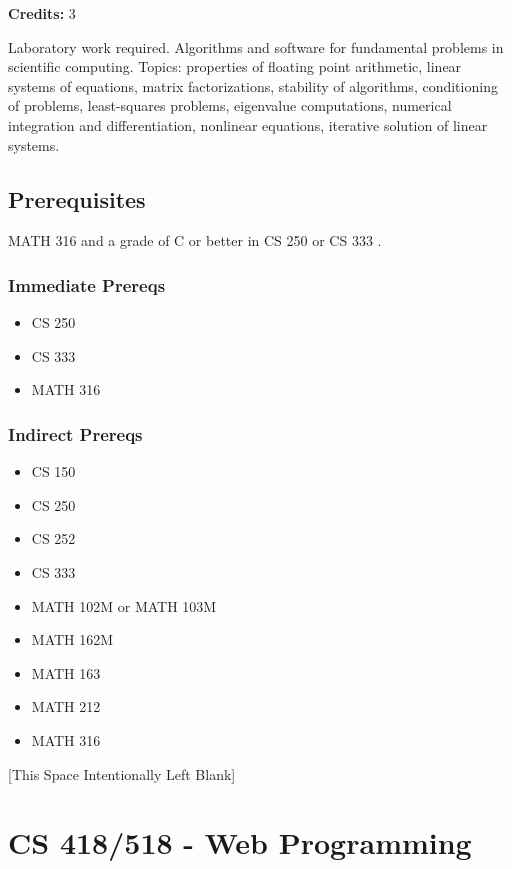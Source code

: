 \documentclass[]{article}
\providecommand{\tightlist}{%
  \setlength{\itemsep}{0pt}\setlength{\parskip}{0pt}}
\newcommand{\pagebreakhere}{
\vspace*{\fill}
\begin{center}
[This Space Intentionally Left Blank]
\end{center}
\vspace*{\fill}
\newpage
}
\begin{document}
\textbf{Credits:} 3

Laboratory work required. Algorithms and software for fundamental
problems in scientific computing. Topics: properties of floating point
arithmetic, linear systems of equations, matrix factorizations,
stability of algorithms, conditioning of problems, least-squares
problems, eigenvalue computations, numerical integration and
differentiation, nonlinear equations, iterative solution of linear
systems.

\subsection{Prerequisites}\label{prerequisites-28}

MATH 316 and a grade of C or better in CS 250 or CS 333 .

\subsubsection{Immediate Prereqs}\label{immediate-prereqs-20}

\begin{itemize}
\tightlist
\item
  CS 250
\item
  CS 333
\item
  MATH 316
\end{itemize}

\subsubsection{Indirect Prereqs}\label{indirect-prereqs-20}

\begin{itemize}
\tightlist
\item
  CS 150
\item
  CS 250
\item
  CS 252
\item
  CS 333
\item
  MATH 102M or MATH 103M
\item
  MATH 162M
\item
  MATH 163
\item
  MATH 212
\item
  MATH 316
\end{itemize}

\pagebreakhere
\section{CS 418/518 - Web
Programming}\label{cs-418518---web-programming}
\end{document}
